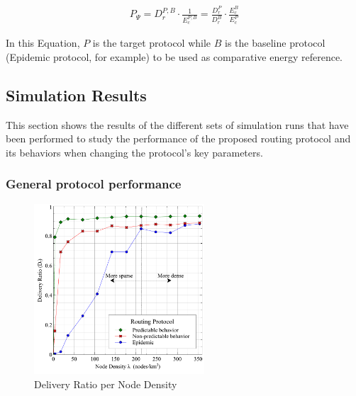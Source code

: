 \begin{eqnarray}
\label{eq:protocol_performance}
{ P }_{ \Psi }= {{ D }_{ r }^{ P,B }} \cdot \frac { 1 }{ { E }_{c}^{ P,B } } 
= \frac {{ D }_{ r }^{ P }}{{ D }_{ r }^{ B } } \cdot \frac{{ E }_{c}^{ B }}{{ E }_{c}^{ P }}
\end{eqnarray}

In this Equation, $P$ is the target protocol while $B$ is the baseline protocol (Epidemic protocol, for example) to be used as comparative energy reference.

\subsection{Simulation Results}

This section shows the results of the different sets of simulation runs that have been performed to study the performance of the proposed routing protocol and its behaviors when changing the protocol's key parameters.

\subsubsection{General protocol performance}

\begin{figure}[!t]
	\centering
	\includegraphics[width=2.5in]{Graphs/DeliveryRatio.pdf}
	\caption{Delivery Ratio per Node Density}
	\label{Delivery Ratio per Node Density}
\end{figure}

